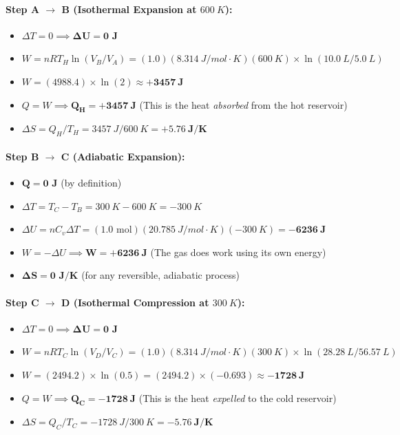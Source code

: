 \documentclass[article]{article}
\begin{document}
\paragraph{Step A $\to$ B (Isothermal Expansion at $\SI{600}{K}$):}
\begin{itemize}
    \item $\Delta T = 0 \implies \mathbf{\Delta U = 0 \text{ J}}$
    \item $W = nRT_H \ln(V_B / V_A) = (1.0)(\SI{8.314}{J/mol\cdot K})(\SI{600}{K}) \times \ln(\SI{10.0}{L} / \SI{5.0}{L})$
    \item $W = (4988.4) \times \ln(2) \approx \mathbf{+\SI{3457}{J}}$
    \item $Q = W \implies \mathbf{Q_H = +\SI{3457}{J}}$ (This is the heat \textit{absorbed} from the hot reservoir)
    \item $\Delta S = Q_H / T_H = \SI{3457}{J} / \SI{600}{K} = \mathbf{+\SI{5.76}{J/K}}$
\end{itemize}

\paragraph{Step B $\to$ C (Adiabatic Expansion):}
\begin{itemize}
    \item $\mathbf{Q = 0 \text{ J}}$ (by definition)
    \item $\Delta T = T_C - T_B = \SI{300}{K} - \SI{600}{K} = \SI{-300}{K}$
    \item $\Delta U = nC_v\Delta T = (1.0 \text{ mol})(\SI{20.785}{J/mol\cdot K})(\SI{-300}{K}) = \mathbf{-\SI{6236}{J}}$
    \item $W = -\Delta U \implies \mathbf{W = +\SI{6236}{J}}$ (The gas does work using its own energy)
    \item $\mathbf{\Delta S = 0 \text{ J/K}}$ (for any reversible, adiabatic process)
\end{itemize}

\paragraph{Step C $\to$ D (Isothermal Compression at $\SI{300}{K}$):}
\begin{itemize}
    \item $\Delta T = 0 \implies \mathbf{\Delta U = 0 \text{ J}}$
    \item $W = nRT_C \ln(V_D / V_C) = (1.0)(\SI{8.314}{J/mol\cdot K})(\SI{300}{K}) \times \ln(\SI{28.28}{L} / \SI{56.57}{L})$
    \item $W = (2494.2) \times \ln(0.5) = (2494.2) \times (-0.693) \approx \mathbf{-\SI{1728}{J}}$
    \item $Q = W \implies \mathbf{Q_C = -\SI{1728}{J}}$ (This is the heat \textit{expelled} to the cold reservoir)
    \item $\Delta S = Q_C / T_C = \SI{-1728}{J} / \SI{300}{K} = \mathbf{-\SI{5.76}{J/K}}$
\end{itemize}
\end{document}
